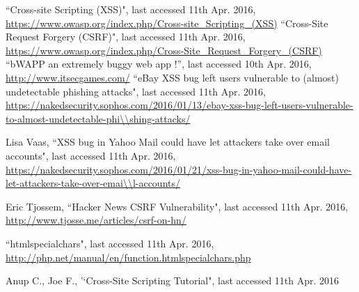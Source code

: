 \documentclass[12pt]{extarticle}
\begin{document}
\pagebreak

\begin{thebibliography}{99}
``Cross-site Scripting (XSS)", last accessed 11th Apr. 2016, \url{https://www.owasp.org/index.php/Cross-site\_Scripting\_(XSS)}
``Cross-Site Request Forgery (CSRF)", last accessed 11th Apr. 2016, \url{https://www.owasp.org/index.php/Cross-Site\_Request\_Forgery\_(CSRF)}
``bWAPP an extremely buggy web app !”, last accessed 10th Apr. 2016, \url{http://www.itsecgames.com/}
``eBay XSS bug left users vulnerable to (almost) undetectable phishing attacks", last accessed 11th Apr. 2016, 
\url{https://nakedsecurity.sophos.com/2016/01/13/ebay-xss-bug-left-users-vulnerable-to-almost-undetectable-phi\\shing-attacks/}

Lisa Vaas, ``XSS bug in Yahoo Mail could have let attackers take over email accounts", last accessed 11th Apr. 2016, \url{https://nakedsecurity.sophos.com/2016/01/21/xss-bug-in-yahoo-mail-could-have-let-attackers-take-over-emai\\l-accounts/}

Eric Tjossem, ``Hacker News CSRF Vulnerability", last accessed 11th Apr. 2016, 
\url{http://www.tjosse.me/articles/csrf-on-hn/}

``htmlspecialchars", last accessed 11th Apr. 2016, \url{http://php.net/manual/en/function.htmlspecialchars.php}

Anup C., Joe F., '`Cross-Site Scripting Tutorial", last accessed 11th Apr. 2016

\end{thebibliography}
\end{document}
